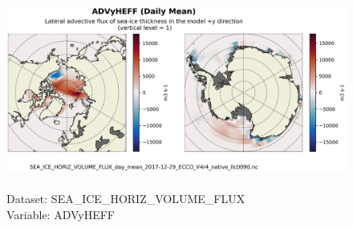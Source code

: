 \begin{figure}[H]
\centering
\includegraphics[scale=0.5]{../images/plots/native_plots/Sea-Ice_and_Snow_Horizontal_Volume_Fluxes/ADVyHEFF.png}
\caption{\\Dataset: SEA\_ICE\_HORIZ\_VOLUME\_FLUX\\Variable: ADVyHEFF}
\label{tab:table-SEA_ICE_HORIZ_VOLUME_FLUX_ADVyHEFF-Plot}
\end{figure}
\pagebreak
